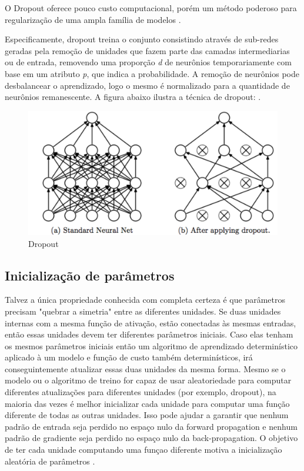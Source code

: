 \documentclass[12pt]{article}
\begin{document}
O Dropout oferece pouco custo computacional, porém um método poderoso para regularização de uma ampla família de modelos \cite{DBLP:journals/corr/abs-1207-0580}.

Especificamente, dropout treina o conjunto consistindo através de sub-redes geradas pela remoção de unidades que fazem parte das camadas intermediarias ou de entrada, removendo uma proporção \textit{d} de neurônios temporariamente com base em um atributo \textit{p}, que indica a probabilidade. A remoção de neurônios pode desbalancear o aprendizado, logo o mesmo é normalizado para a quantidade de neurônios remanescente. A figura abaixo ilustra a técnica de dropout: \cite{Goodfellow-et-al-2016}.

\begin{figure}[!htb]
\centering
\includegraphics[width=.8\textwidth]{images/dropout.png}
\caption{Dropout}
\label{fig:dropout}
\end{figure}

\subsection{Inicialização de parâmetros}

Talvez a única propriedade conhecida com completa certeza é que parâmetros precisam "quebrar a simetria" entre as diferentes unidades. Se duas unidades internas com a mesma função de ativação, estão conectadas às mesmas entradas, então essas unidades devem ter diferentes parâmetros iniciais. Caso elas tenham os mesmos parâmetros iniciais então um algoritmo de aprendizado determinístico aplicado à um modelo e função de custo também determinísticos, irá conseguintemente atualizar essas duas unidades da mesma forma. Mesmo se o modelo ou o algoritmo de treino for capaz de usar aleatoriedade para computar diferentes atualizações para diferentes unidades (por exemplo, dropout), na maioria das vezes é melhor inicializar cada unidade para computar uma função diferente de todas as outras unidades. Isso pode ajudar a garantir que nenhum padrão de entrada seja perdido no espaço nulo da forward propagation e nenhum padrão de gradiente seja perdido no espaço nulo da back-propagation. O objetivo de ter cada unidade computando uma funçao diferente motiva a inicialização aleatória de parâmetros \cite{Goodfellow-et-al-2016}.
\end{document}
